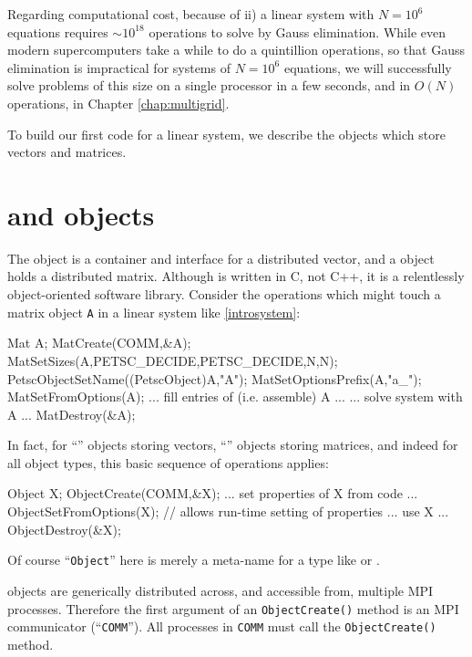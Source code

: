 Regarding computational cost, because of ii) a linear system with $N=10^6$ equations requires $\sim 10^{18}$ operations to solve by Gauss elimination.  While even modern supercomputers take a while to do a quintillion operations, so that Gauss elimination is impractical for systems of $N=10^6$ equations, we will successfully solve problems of this size on a single processor in a few seconds, and in $O(N)$ operations, in Chapter \ref{chap:multigrid}.

To build our first \PETSc code for a linear system, we describe the \PETSc objects which store vectors and matrices.


\section{\PETSc \pVec and \pMat objects}

The \pVec object is a container and interface for a distributed vector, and a \pMat object holds a distributed matrix.  Although \PETSc is written in C, not C++, it is a relentlessly object-oriented software library.  Consider the operations which might touch a matrix object \texttt{A} in a linear system like \eqref{introsystem}:
\begin{code}
Mat A;
MatCreate(COMM,&A);
MatSetSizes(A,PETSC_DECIDE,PETSC_DECIDE,N,N);
PetscObjectSetName((PetscObject)A,"A");
MatSetOptionsPrefix(A,"a_");
MatSetFromOptions(A);
... fill entries of (i.e. assemble) A ...
... solve system with A ...
MatDestroy(&A);
\end{code}
In fact, for ``\pVec'' objects storing vectors, ``\pMat'' objects storing matrices, and indeed for all \PETSc object types, this basic sequence of operations applies:
\begin{code}
Object X;
ObjectCreate(COMM,&X);
... set properties of X from code ...
ObjectSetFromOptions(X);  // allows run-time setting of properties
... use X ...
ObjectDestroy(&X);
\end{code}
Of course ``\texttt{Object}'' here is merely a meta-name for a \PETSc type like \pVec or \pMat.

\PETSc objects are generically distributed across, and accessible from, multiple MPI processes.  Therefore the first argument of an \texttt{ObjectCreate()} method is an MPI communicator (``\texttt{COMM}'').  All processes in \texttt{COMM} must call the \texttt{ObjectCreate()} method.

